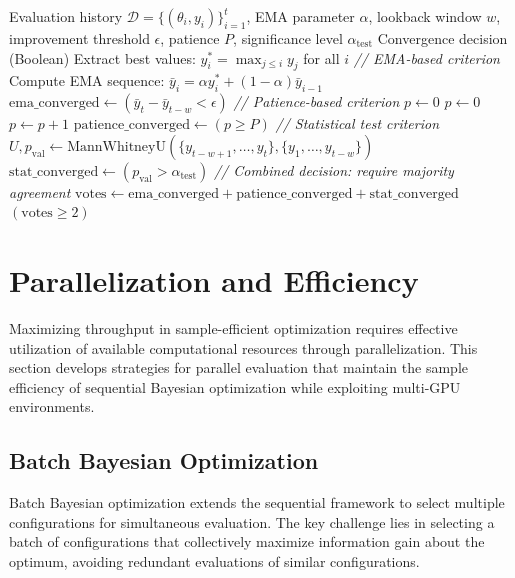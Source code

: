 \begin{algorithm}[htbp]
\caption{Convergence Detection for Sample-Efficient Optimization}
\label{alg:convergence}
\begin{algorithmic}[1]
\Require Evaluation history $\mathcal{D} = \{(\theta_i, y_i)\}_{i=1}^t$, EMA parameter $\alpha$, lookback window $w$, improvement threshold $\epsilon$, patience $P$, significance level $\alpha_{\text{test}}$
\Ensure Convergence decision (Boolean)
\State Extract best values: $y_i^* = \max_{j \leq i} y_j$ for all $i$
\State \textit{// EMA-based criterion}
\State Compute EMA sequence: $\bar{y}_i = \alpha y_i^* + (1-\alpha)\bar{y}_{i-1}$
\State $\text{ema\_converged} \gets (\bar{y}_t - \bar{y}_{t-w} < \epsilon)$
\State \textit{// Patience-based criterion}
\State $p \gets 0$
        \State $p \gets 0$
    \Else
        \State $p \gets p + 1$
    \EndIf
\EndFor
\State $\text{patience\_converged} \gets (p \geq P)$
\State \textit{// Statistical test criterion}
\State $U, p_{\text{val}} \gets \text{MannWhitneyU}(\{y_{t-w+1}, \ldots, y_t\}, \{y_1, \ldots, y_{t-w}\})$
\State $\text{stat\_converged} \gets (p_{\text{val}} > \alpha_{\text{test}})$
\State \textit{// Combined decision: require majority agreement}
\State $\text{votes} \gets \text{ema\_converged} + \text{patience\_converged} + \text{stat\_converged}$
\State \Return $(\text{votes} \geq 2)$
\end{algorithmic}
\end{algorithm}

\section{Parallelization and Efficiency}
\label{sec:parallelization}

Maximizing throughput in sample-efficient optimization requires effective utilization of available computational resources through parallelization. This section develops strategies for parallel evaluation that maintain the sample efficiency of sequential Bayesian optimization while exploiting multi-GPU environments.

\subsection{Batch Bayesian Optimization}

Batch Bayesian optimization extends the sequential framework to select multiple configurations for simultaneous evaluation. The key challenge lies in selecting a batch of configurations that collectively maximize information gain about the optimum, avoiding redundant evaluations of similar configurations.

